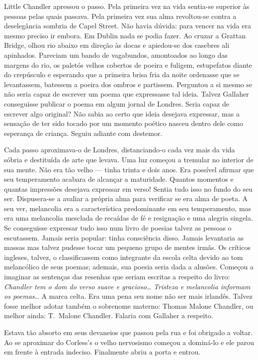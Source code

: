 Little Chandler apressou o passo.  Pela primeira vez na vida sentia-se superior
às pessoas pelas quais passava.  Pela primeira vez sua alma revoltou-se contra
a deselegância sombria de Capel Street.  Não havia dúvida: para vencer na vida
era mesmo preciso ir embora.  Em Dublin nada se podia fazer.  Ao cruzar a
Grattan Bridge, olhou rio abaixo em direção às docas e apiedou-se dos casebres
ali apinhados.  Pareciam um bando de vagabundos, amontoados ao longo das
margens do rio, os paletós velhos cobertos de poeira e fuligem, estupefatos
diante do crepúsculo e esperando que a primeira brisa fria da noite ordenasse
que se levantassem, batessem a poeira dos ombros e partissem.  Perguntou a si
mesmo se não seria capaz de escrever um poema que expressasse tal ideia.
Talvez Gallaher conseguisse publicar o poema em algum jornal de Londres.  Seria
capaz de escrever algo original?  Não sabia ao certo que ideia desejava
expressar, mas a sensação de ter sido tocado por um momento poético nasceu
dentro dele como esperança de criança.  Seguiu adiante com destemor.

Cada passo aproximava-o de Londres, distanciando-o cada vez mais da vida sóbria
e destituída de arte que levava.  Uma luz começou a tremular no interior de sua
mente.  Não era tão velho --- tinha trinta e dois anos.  Era possível
afirmar que seu temperamento acabara de alcançar a maturidade.  Quantos
momentos e quantas impressões desejava expressar em verso!  Sentia tudo isso no
fundo do seu ser.  Dispusera-se a avaliar a própria alma para verificar se era
alma de poeta.  A seu ver, melancolia era a característica predominante em seu
temperamento, mas era uma melancolia mesclada de recaídas de fé e resignação e
uma alegria singela.  Se conseguisse expressar tudo isso num livro de poesias
talvez as pessoas o escutassem.  Jamais seria popular: tinha consciência disso.
Jamais levantaria as massas mas talvez pudesse tocar um pequeno grupo de mentes
irmãs.  Os críticos ingleses, talvez, o classificassem como integrante da
escola celta devido ao tom melancólico de seus poemas; ademais, sua poesia
seria dada a alusões.  Começou a imaginar as sentenças das resenhas que seriam
escritas a respeito do livro: \textit{Chandler tem o dom do verso
suave e gracioso\ldots{}}  \textit{Tristeza e melancolia informam os
poemas}\ldots{ A marca celta}.  Era uma pena seu nome não ser mais irlandês.
Talvez fosse melhor adotar também o sobrenome materno: Thomas Malone Chandler,
ou melhor ainda: T.~Malone Chandler.  Falaria com Gallaher a respeito.

Estava tão absorto em seus devaneios que passou pela rua e foi obrigado a
voltar.  Ao se aproximar do Corless’s o velho nervosismo começou a dominá-lo e
ele parou em frente à entrada indeciso.  Finalmente abriu a porta e entrou.

